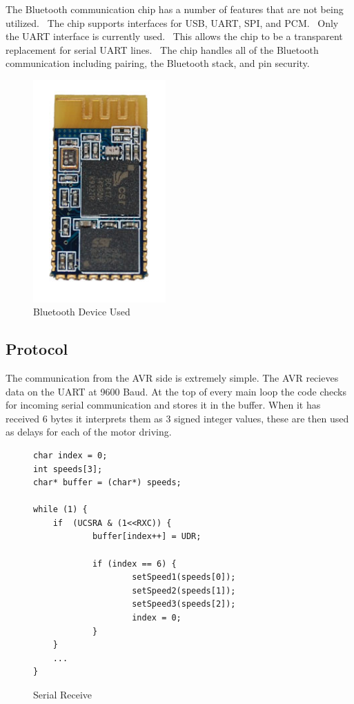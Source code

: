 The Bluetooth communication chip has a number of features that are not being utilized.  The chip supports interfaces for USB, UART, SPI, and PCM.  Only the UART interface is currently used.  This allows the chip to be a transparent replacement for serial UART lines.  The chip handles all of the Bluetooth communication including pairing, the Bluetooth stack, and pin security. 

\begin{figure}[H]
    \begin{center}
        \includegraphics[width=2in]{images/bluetooth.png}
    \end{center}
    \caption{Bluetooth Device Used}
    \label{figure:bluetooth}
\end{figure}

\subsection{Protocol}

The communication from the AVR side is extremely simple.  The AVR recieves data on the UART at 9600 Baud.  At the top of every main loop the code checks for incoming serial communication and stores it in the buffer.  When it has received 6 bytes it interprets them as 3 signed integer values, these are then used as delays for each of the motor driving. 

\begin{figure}[H]
\begin{lstlisting}
char index = 0;
int speeds[3];
char* buffer = (char*) speeds;

while (1) {
    if  (UCSRA & (1<<RXC)) {
            buffer[index++] = UDR;

            if (index == 6) {
                    setSpeed1(speeds[0]);
                    setSpeed2(speeds[1]);
                    setSpeed3(speeds[2]);
                    index = 0;
            }
    }
	...
}
\end{lstlisting}
\caption{Serial Receive}
\label{figure:uart_receive}
\end{figure}

